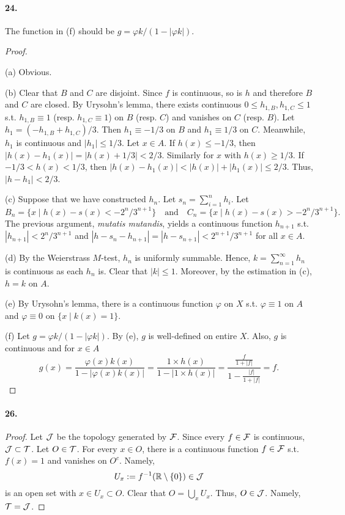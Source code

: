 \paragraph{24.}
  The function in (f) should be $g = \varphi k / (1 - |\varphi k|)$.
\begin{proof}
  $\,$\par
  (a) Obvious.
  
  (b) Clear that $B$ and $C$ are disjoint. Since $f$ is continuous, so is
  $h$ and therefore $B$ and $C$ are closed. By Urysohn's lemma, there exists
  continuous $0 \le h_{1, B}, h_{1, C} \le 1$ s.t. $h_{1, B} \equiv 1$ (resp. 
  $h_{1, C} \equiv 1$) on $B$ (resp. $C$) and vanishes on $C$ (resp. $B$). Let
  $h_1 = (-h_{1, B} + h_{1, C}) / 3$. Then $h_1 \equiv -1/3$ on $B$ and 
  $h_1 \equiv 1/3$ on $C$. Meanwhile, $h_1$ is continuous and $|h_1| \le 1/3$.
  Let $x \in A$. If $h(x) \le -1/3$, then $|h(x) - h_1(x)| = |h(x) + 1/3| <
  2/3$. Similarly for $x$ with $h(x) \ge 1/3$. If $-1/3 < h(x) < 1/3$, then
  $|h(x) - h_1(x)| < |h(x)| + |h_1(x)| \le 2/3$. Thus, $|h - h_1| < 2/3$.
  
  (c) Suppose that we have constructed $h_n$. Let $s_n = \sum_{i=1}^n h_i$. Let
  \[
    B_n = \{x \mid h(x) - s(x) < -2^n/3^{n+1}\}
    \quad\text{and}\quad
    C_n = \{x \mid h(x) - s(x) > -2^n/3^{n+1}\}.
  \]
  The previous argument, \textit{mutatis mutandis}, yields a continuous 
  function $h_{n+1}$ s.t. $|h_{n+1}| < 2^n/3^{n+1}$ and $|h - s_n - h_{n+1}|
  = |h - s_{n+1}| < 2^{n+1} / 3^{n+1}$ for all $x \in A$.
  
  (d) By the Weierstrass $M$-test, $h_n$ is uniformly summable. Hence,
  $k = \sum_{n=1}^\infty h_n$ is continuous as each $h_n$ is. Clear that $|k|
  \le 1$. Moreover, by the estimation in (c), $h = k$ on $A$. 
  
  (e) By Urysohn's lemma, there is a continuous function $\varphi$ on $X$ s.t.
  $\varphi \equiv 1$ on $A$ and $\varphi \equiv 0$ on $\{x\mid k(x) = 1\}$.
  
  (f) Let $g = \varphi k / (1 - |\varphi k|)$. By (e), $g$ is well-defined on 
  entire $X$. Also, $g$ is continuous and for $x \in A$
  \[
    g(x) = \frac{\varphi(x) k(x)}{1 - |\varphi(x) k (x)|}
    = \frac{1\times h(x)}{1 - |1\times h(x)|}
    = \frac{\frac{f}{1 + |f|}}{1 - \frac{|f|}{1 + |f|}}
    = f.
  \]
\end{proof}

\paragraph{26.}
\begin{proof}
  Let $\mathcal{J}$ be the topology generated by $\mathcal{F}$. Since every
  $f \in \mathcal{F}$ is continuous, $\mathcal{J} \subset \mathcal{T}$. Let $O \in
  \mathcal{T}$. For every $x \in O$, there is a continuous function $f\in\mathcal{F}$
  s.t. $f(x) = 1$ and vanishes on $O^c$. Namely, 
  \[
    U_x := f^{-1} (\mathbb{R}\setminus\{0\}) \in \mathcal{J}
  \]
  is an open set with $x \in U_x \subset O$. Clear that $O = \bigcup_x U_x$.
  Thus, $O \in \mathcal{J}$. Namely, $\mathcal{T} = \mathcal{J}$.
\end{proof}


